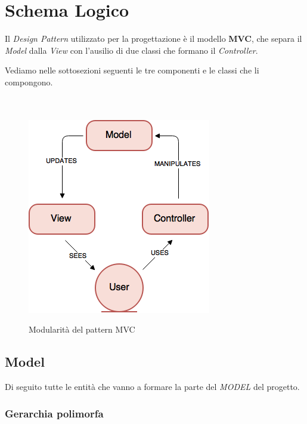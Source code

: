 \documentclass[10pt,a4paper,openany]{article}
\begin{document}
\section{Schema Logico}	

Il \textit{Design Pattern} utilizzato per la progettazione è il modello \textbf{MVC}, che separa il \textit{Model} dalla \textit{View} con l'ausilio di due classi che formano il \textit{Controller}.

Vediamo nelle sottosezioni seguenti le tre componenti e le classi che li compongono.\\\\\\


\begin{figure}[!h]
\centering
\includegraphics[angle=0,scale=.45]{MVC.png}\\
\caption{Modularità del pattern MVC}
\label{fig:MVC}
\end{figure}


\newpage

	\subsection{Model}
	\label{sec:model}
	
	Di seguito tutte le entità che vanno a formare la parte del \emph{MODEL} del progetto.
	
		\subsubsection{Gerarchia polimorfa}
	
\end{document}
